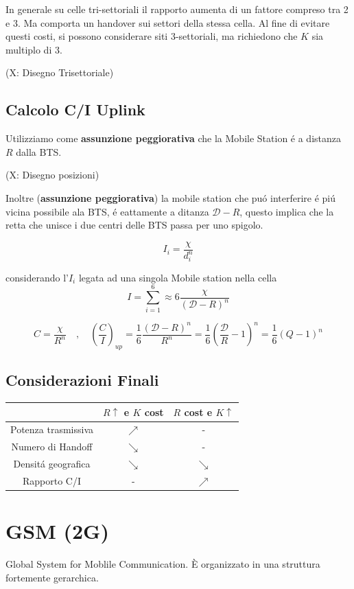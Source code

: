 \documentclass{article}
\begin{document}
In generale su celle tri-settoriali il rapporto aumenta di un fattore compreso tra 2 e 3. Ma comporta un handover sui settori della stessa cella. Al fine di evitare questi costi, si possono considerare siti 3-settoriali, ma richiedono che $K$ sia multiplo di 3.

(X: Disegno Trisettoriale)

\subsection{Calcolo C/I Uplink}
Utilizziamo come \textbf{assunzione peggiorativa} che la Mobile Station \'e a distanza $R$ dalla BTS.

(X: Disegno posizioni)

Inoltre (\textbf{assunzione peggiorativa}) la mobile station che pu\'o interferire \'e pi\'u vicina possibile ala BTS, \'e eattamente a ditanza $\mathcal{D} - R$, questo implica che la retta che unisce i due centri delle BTS passa per uno spigolo.

\[I_i = \frac{\chi}{d_i^n} \]

considerando l'$I_i$ legata ad una singola Mobile station nella cella
\[ I = \sum\limits_{i=1}^6 \approx 6\frac{\chi}{{(\mathcal{D} - R)}^n} \]

\[ C = \frac{\chi}{R^n} \quad,\quad {\left(\frac{C}{I}\right)}_{up}
    = \frac{1}{6}\frac{{(\mathcal{D} - R)}^n}{R^n}
    = \frac{1}{6}\left(\frac{\mathcal{D}}{R} -1 \right)^n = \frac{1}{6}(Q - 1)^n
\]

\subsection{Considerazioni Finali}
\begin{center}
\begin{tabular}{c|c|c}
    & $R\uparrow$ e $K$ cost & $R$ cost e $K\uparrow$\\
    \hline
    Potenza trasmissiva  & {\color{red}$\nearrow$}  & -\\
    Numero di Handoff    & {\color{green}$\searrow$}& -\\
    Densit\'a geografica & {\color{red}$\searrow$}  & {\color{red}$\searrow$}\\
    Rapporto C/I         &                         -& {\color{green}$\nearrow$}
\end{tabular}
\end{center}

\section{GSM (2G)}
Global System for Moblile Communication. \`E organizzato in una struttura fortemente gerarchica.
\end{document}
